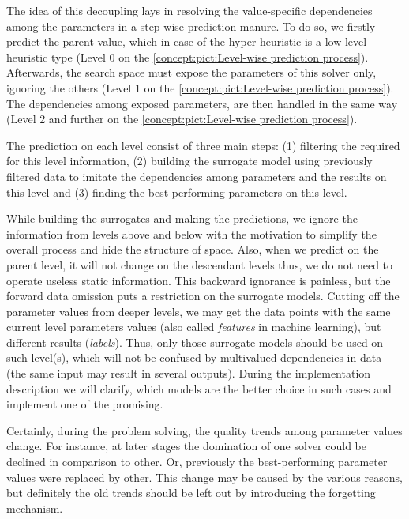 The idea of this decoupling lays in resolving the value-specific dependencies among the parameters in a step-wise prediction manure. To do so, we firstly predict the parent value, which in case of the hyper-heuristic is a low-level heuristic type (Level 0 on the \cref{concept:pict:Level-wise prediction process}). Afterwards, the search space must expose the parameters of this solver only, ignoring the others (Level 1 on the \cref{concept:pict:Level-wise prediction process}). The dependencies among exposed parameters, are then handled in the same way (Level 2 and further on the \cref{concept:pict:Level-wise prediction process}).

The prediction on each level consist of three main steps: (1) filtering the required for this level information, (2) building the surrogate model using previously filtered data to imitate the dependencies among parameters and the results on this level and (3) finding the best performing parameters on this level.

While building the surrogates and making the predictions, we ignore the information from levels above and below with the motivation to simplify the overall process and hide the structure of space. Also, when we predict on the parent level, it will not change on the descendant levels thus, we do not need to operate useless static information. This backward ignorance is painless, but the forward data omission puts a restriction on the surrogate models. Cutting off the parameter values from deeper levels, we may get the data points with the same current level parameters values (also called \emph{features} in machine learning), but different results (\emph{labels}). Thus, only those surrogate models should be used on such level(s), which will not be confused by multivalued dependencies in data (the same input may result in several outputs). During the implementation description we will clarify, which models are the better choice in such cases and implement one of the promising.

Certainly, during the problem solving, the quality trends among parameter values change. For instance, at later stages the domination of one solver could be declined in comparison to other. Or, previously the best-performing parameter values were replaced by other. This change may be caused by the various reasons, but definitely the old trends should be left out by introducing the forgetting mechanism.

